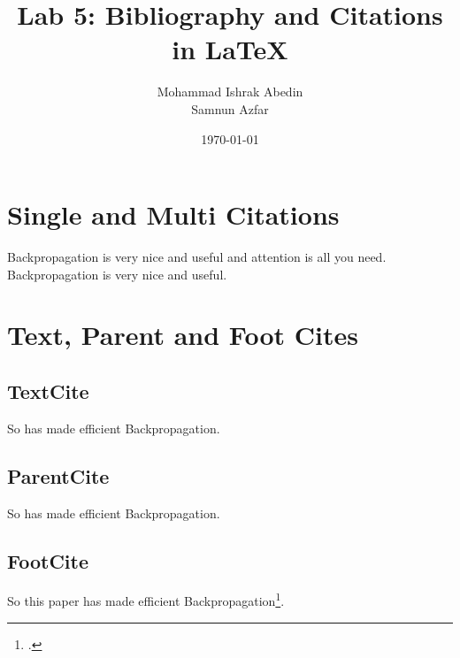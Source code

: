 \documentclass[a4paper,12pt]{article}
\title{Lab 5: Bibliography and Citations in \LaTeX}
\author{Mohammad Ishrak Abedin \\ Samnun Azfar}
\date{\today}
\begin{document}
\begin{titlepage}  
    \maketitle
\end{titlepage}

\tableofcontents


\section{Single and Multi Citations}

Backpropagation is very nice and useful and attention is all you need\cite{vaswani2017attention,lecun2002efficient}.\\
Backpropagation is very nice and useful\cite{lecun2002efficient}. \\

\section{Text, Parent and Foot Cites}

\subsection{TextCite}
So \textcite{lecun2002efficient} has made efficient Backpropagation. 
\subsection{ParentCite}
So \parencite{lecun2002efficient} has made efficient Backpropagation. 
\subsection{FootCite}
So this paper has made efficient Backpropagation\footcite{lecun2002efficient}. 



\newpage
% 

\printbibliography[title={These are the References},heading={bibintoc}]
\end{document}
